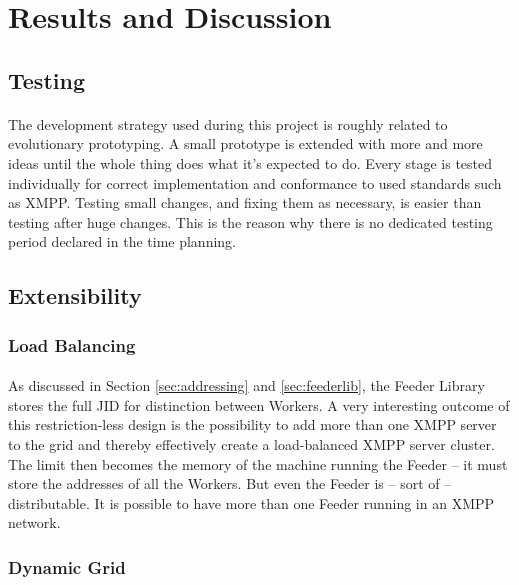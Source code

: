 \section{Results and Discussion}
\label{sec:discussion}

\subsection{Testing}
\label{sec:testing}
\paragraph{}
The development strategy used during this project is roughly related to evolutionary prototyping. A small prototype is extended with more and more ideas until the whole thing does what it's expected to do. Every stage is tested individually for correct implementation and conformance to used standards such as XMPP. Testing small changes, and fixing them as necessary, is easier than testing after huge changes. This is the reason why there is no dedicated testing period declared in the time planning.


\subsection{Extensibility}
\label{sec:extensibility}

\subsubsection{Load Balancing}
\paragraph{}
As discussed in Section \ref{sec:addressing} and \ref{sec:feederlib}, the Feeder Library stores the full JID for distinction between Workers. A very interesting outcome of this restriction-less design is the possibility to add more than one XMPP server to the grid and thereby effectively create a load-balanced XMPP server cluster. The limit then becomes the memory of the machine running the Feeder -- it must store the addresses of all the Workers. But even the Feeder is -- sort of -- distributable. It is possible to have more than one Feeder running in an XMPP network.

\subsubsection{Dynamic Grid}

